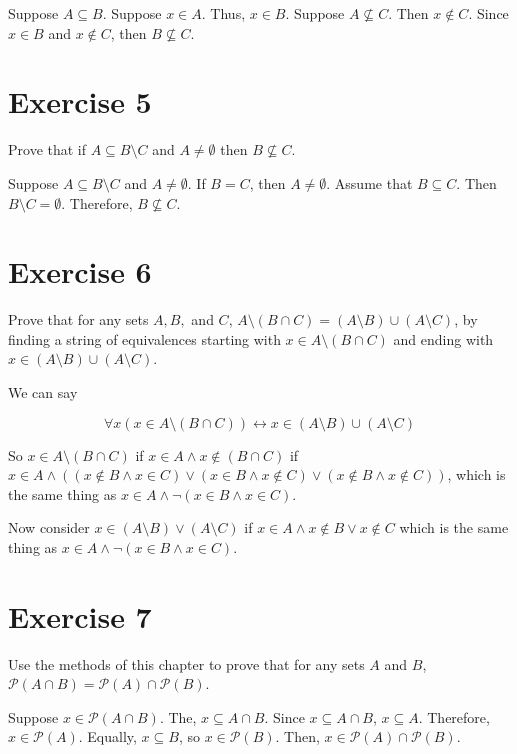 \documentclass[11pt]{article}
\newcommand{\bicond}{\leftrightarrow}
\newcommand{\powerset}[1]{\mathscr{P}(#1)}
\begin{document}
Suppose $A \subseteq B$. Suppose $x \in A$. Thus, $x \in B$. 
Suppose $A \nsubseteq C$. Then $x \notin C$. Since $x \in B$ and $x \notin C$,
then $B \nsubseteq C$.

\section*{Exercise 5}

Prove that if $A \subseteq B \setminus C$ and $A \neq \emptyset$ then 
$B \nsubseteq C$.

Suppose $A \subseteq B \setminus C$ and $A \neq \emptyset$. If $B = C$, then 
$A \neq \emptyset$. Assume that $B \subseteq C$. Then $B \setminus C = \emptyset$.
Therefore, $B \nsubseteq C$.

\section*{Exercise 6}

Prove that for any sets $A, B,$ and $C$, 
$A \setminus (B \cap C) = (A \setminus B) \cup (A \setminus C)$, by finding a 
string of equivalences starting with $x \in A \setminus (B \cap C)$ and ending 
with $x \in (A \setminus B) \cup (A \setminus C)$.

We can say 

$$\forall x (x \in A \setminus (B \cap C)) \bicond x \in (A \setminus B) \cup (A \setminus C)$$

So $x \in A \setminus (B \cap C)$ if $x \in A \wedge x \notin (B \cap C)$ if 
$x \in A \wedge ((x \notin B \wedge x \in C) \vee (x \in B \wedge x \notin C) 
\vee (x \notin B \wedge x \notin C))$, which is the same thing as 
$x \in A \wedge \neg (x \in B \wedge x \in C)$.

Now consider $x \in (A \setminus B) \vee (A \setminus C)$ if 
$x \in A \wedge x \notin B \vee x \notin C$ which is the same thing as 
$x \in A \wedge \neg (x \in B \wedge x \in C)$.

\section*{Exercise 7}

Use the methods of this chapter to prove that for any sets $A$ and $B$,
$\powerset{A \cap B} = \powerset{A} \cap \powerset{B}$.

Suppose $x \in \powerset{A \cap B}$. The, $x \subseteq A \cap B$. Since 
$x \subseteq A \cap B$, $x \subseteq A$. Therefore, $x \in \powerset{A}$. 
Equally, $x \subseteq B$, so $x \in \powerset{B}$. Then, 
$x \in \powerset{A} \cap \powerset{B}$.
\end{document}

